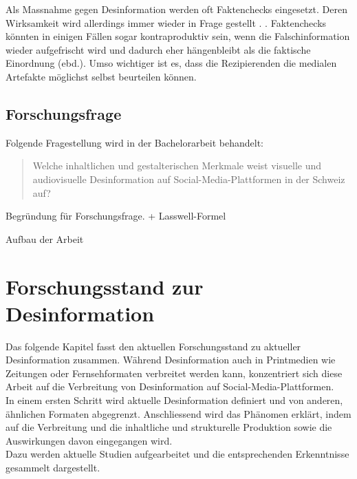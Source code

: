 \documentclass[12pt,a4paper]{article}        %
\begin{document}
Als Massnahme gegen Desinformation werden oft Faktenchecks eingesetzt. Deren Wirksamkeit wird allerdings immer wieder in Frage gestellt \parencites[1095]{lazer_science_2018}[4f]{ceron_fake_2021}.  \parencites[1095]{lazer_science_2018}\parencite[vgl.\ auch][18]{grujic_warnhinweise_2024}. Faktenchecks könnten in einigen Fällen sogar kontraproduktiv sein, wenn  die Falschinformation wieder aufgefrischt wird und dadurch eher hängenbleibt als die faktische Einordnung (ebd.). Umso wichtiger ist es, dass die Rezipierenden die medialen Artefakte möglichst selbst beurteilen können.

\subsection{Forschungsfrage}
Folgende Fragestellung wird in der Bachelorarbeit behandelt:

\begin{quote}
  Welche inhaltlichen und gestalterischen Merkmale weist visuelle und audiovisuelle Desinformation auf Social-Media-Plattformen in der Schweiz auf?
\end{quote}
\color{red}Begründung für Forschungsfrage. + Lasswell-Formel

\color{red}Aufbau der Arbeit
\color{black}
\pagebreak
\section{Forschungsstand zur Desinformation}
Das folgende Kapitel fasst den aktuellen Forschungsstand zu aktueller Desinformation zusammen. Während Desinformation auch in Printmedien wie Zeitungen oder Fernsehformaten verbreitet werden kann, konzentriert sich diese Arbeit auf die Verbreitung von Desinformation auf Social-Media-Plattformen.\\
In einem ersten Schritt wird aktuelle Desinformation definiert und von anderen, ähnlichen Formaten abgegrenzt. Anschliessend wird das Phänomen erklärt, indem auf die Verbreitung und die inhaltliche und strukturelle Produktion sowie die Auswirkungen davon eingegangen wird. \\
Dazu werden aktuelle Studien aufgearbeitet und die entsprechenden Erkenntnisse gesammelt dargestellt.
\end{document}
